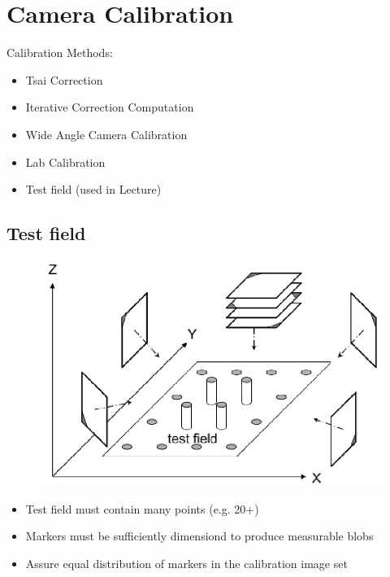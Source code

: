 \section{Camera Calibration}
Calibration Methods:
\begin{itemize}
    \item Tsai Correction
    \item Iterative Correction Computation
    \item Wide Angle Camera Calibration
    \item Lab Calibration
    \item Test field (used in Lecture)
\end{itemize}

\subsection{Test field}
\begin{figure}[ht]
    \centering
    \includegraphics[width = \columnwidth]{Images/10/testfield.png}
    \label{fig:testfield}
\end{figure}
\begin{itemize}
    \item Test field must contain many points (e.g. 20+)
    \item Markers must be sufficiently dimensiond to produce measurable blobs
    \item Assure equal distribution of markers in the calibration image set
\end{itemize}

